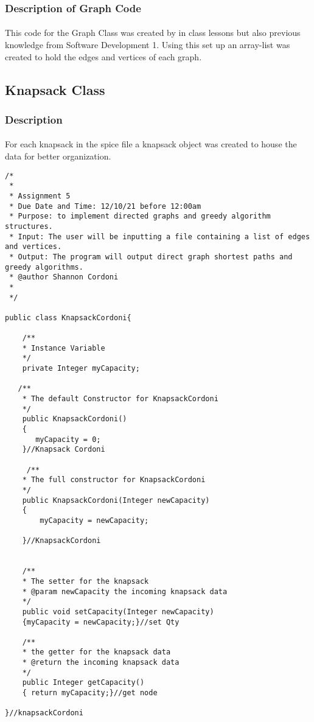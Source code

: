 \documentclass[letterpaper, 10pt,DIV=13]{scrartcl}
\numberwithin{equation}{section} %
\numberwithin{figure}{section} %
\numberwithin{table}{section} %
\begin{document}
\subsubsection{Description of Graph Code}
\paragraph{} This code for the Graph Class was created by in class lessons but also previous knowledge from Software Development 1. Using this set up an array-list was created to hold the edges and vertices of each graph.



\subsection{Knapsack Class}

\subsubsection{Description}
\paragraph{} For each knapsack in the spice file a knapsack object was created to house the data for better organization.

\lstset{numbers=left, numberstyle=\tiny, stepnumber=1, numbersep=5pt, basicstyle=\footnotesize\ttfamily}
\begin{lstlisting}[frame=single, ]
/*
 * 
 * Assignment 5
 * Due Date and Time: 12/10/21 before 12:00am 
 * Purpose: to implement directed graphs and greedy algorithm structures.
 * Input: The user will be inputting a file containing a list of edges and vertices. 
 * Output: The program will output direct graph shortest paths and greedy algorithms. 
 * @author Shannon Cordoni 
 * 
 */

public class KnapsackCordoni{

    /**
    * Instance Variable 
    */
    private Integer myCapacity;
   
   /**
    * The default Constructor for KnapsackCordoni
    */
    public KnapsackCordoni()
    {
       myCapacity = 0;
    }//Knapsack Cordoni

     /**
    * The full constructor for KnapsackCordoni
    */
    public KnapsackCordoni(Integer newCapacity)
    {
        myCapacity = newCapacity;
        
    }//KnapsackCordoni
   

    /**
    * The setter for the knapsack
    * @param newCapacity the incoming knapsack data
    */
    public void setCapacity(Integer newCapacity)
    {myCapacity = newCapacity;}//set Qty

    /**
    * the getter for the knapsack data 
    * @return the incoming knapsack data
    */
    public Integer getCapacity()
    { return myCapacity;}//get node

}//knapsackCordoni
\end{lstlisting}
\end{document}
